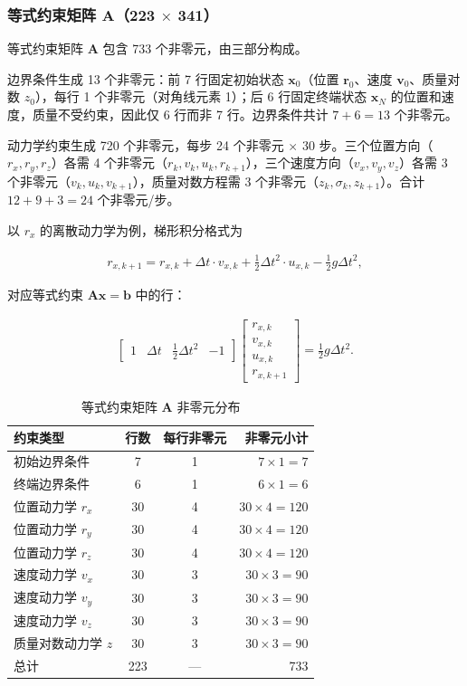 \subsubsection{\texorpdfstring{等式约束矩阵 $\bm{A}$（223 $\times$ 341）}{等式约束矩阵 A (223 x 341)}}

等式约束矩阵 $\bm{A}$ 包含 733 个非零元，由三部分构成。

边界条件生成 13 个非零元：前 7 行固定初始状态 $\bm{x}_0$（位置 $\bm{r}_0$、速度 $\bm{v}_0$、质量对数 $z_0$），每行 1 个非零元（对角线元素 1）；后 6 行固定终端状态 $\bm{x}_N$ 的位置和速度，质量不受约束，因此仅 6 行而非 7 行。边界条件共计 $7 + 6 = 13$ 个非零元。

动力学约束生成 720 个非零元，每步 24 个非零元 $\times$ 30 步。三个位置方向（$r_x, r_y, r_z$）各需 4 个非零元（$r_k, v_k, u_k, r_{k+1}$），三个速度方向（$v_x, v_y, v_z$）各需 3 个非零元（$v_k, u_k, v_{k+1}$），质量对数方程需 3 个非零元（$z_k, \sigma_k, z_{k+1}$）。合计 $12 + 9 + 3 = 24$ 个非零元/步。

以 $r_x$ 的离散动力学为例，梯形积分格式为

\begin{align}
r_{x,k+1} = r_{x,k} + \Delta t \cdot v_{x,k} + \frac{1}{2}\Delta t^2 \cdot u_{x,k} - \frac{1}{2}g\Delta t^2,
\end{align}

对应等式约束 $\bm{A}\bm{x} = \bm{b}$ 中的行：

\begin{align}
\begin{bmatrix}
1 & \Delta t & \frac{1}{2}\Delta t^2 & -1
\end{bmatrix}
\begin{bmatrix}
r_{x,k} \\ v_{x,k} \\ u_{x,k} \\ r_{x,k+1}
\end{bmatrix}
= \frac{1}{2}g\Delta t^2.
\end{align}

\begin{table}[H]
\centering
\caption{等式约束矩阵 $\bm{A}$ 非零元分布}
\label{tab:annz}
\begin{tabular}{lccr}
\toprule
约束类型 & 行数 & 每行非零元 & 非零元小计 \\
\midrule
初始边界条件 & 7  & 1 & $7 \times 1 = 7$ \\
终端边界条件 & 6  & 1 & $6 \times 1 = 6$ \\
位置动力学 $r_x$ & 30 & 4 & $30 \times 4 = 120$ \\
位置动力学 $r_y$ & 30 & 4 & $30 \times 4 = 120$ \\
位置动力学 $r_z$ & 30 & 4 & $30 \times 4 = 120$ \\
速度动力学 $v_x$ & 30 & 3 & $30 \times 3 = 90$ \\
速度动力学 $v_y$ & 30 & 3 & $30 \times 3 = 90$ \\
速度动力学 $v_z$ & 30 & 3 & $30 \times 3 = 90$ \\
质量对数动力学 $z$ & 30 & 3 & $30 \times 3 = 90$ \\
\midrule
总计 & 223 & --- & 733 \\
\bottomrule
\end{tabular}
\end{table}

